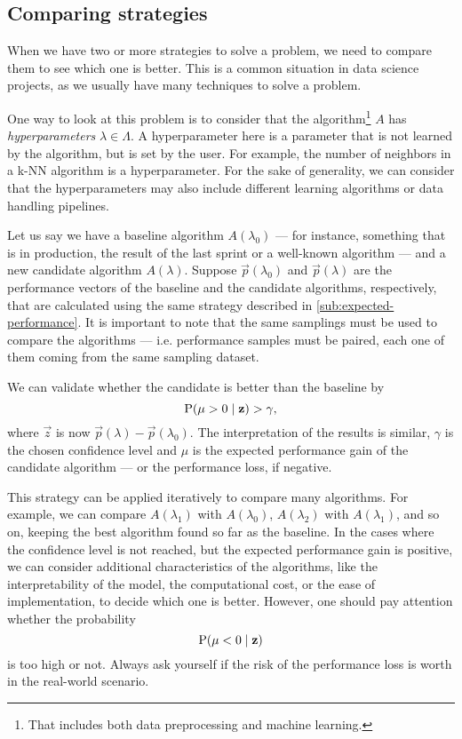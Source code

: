 \subsection{Comparing strategies}
\label{sub:comparison}

When we have two or more strategies to solve a problem, we need to compare them to see
which one is better.  This is a common situation in data science projects, as we usually
have many techniques to solve a problem.

One way to look at this problem is to consider that the algorithm\footnote{That includes
both data preprocessing and machine learning.} $A$ has \emph{hyperparameters} $\lambda \in
\Lambda$.  A hyperparameter here is a parameter that is not learned by the algorithm, but
is set by the user.  For example, the number of neighbors in a k-NN algorithm is a
hyperparameter.  For the sake of generality, we can consider that the hyperparameters may
also include different learning algorithms or data handling pipelines.

Let us say we have a baseline algorithm $A(\lambda_0)$ --- for instance, something that is
in production, the result of the last sprint or a well-known algorithm --- and a new candidate algorithm $A(\lambda)$.
Suppose $\vec{p}(\lambda_0)$ and $\vec{p}(\lambda)$ are the performance vectors of the
baseline and the candidate algorithms, respectively, that are calculated using the same
strategy described in \cref{sub:expected-performance}.  It is important to note that the
same samplings must be used to compare the algorithms --- i.e. performance samples must be
paired, each one of them coming from the same sampling dataset.

We can validate whether the
candidate is better than the baseline by
\begin{equation*}
  \operatorname{P}(\mu > 0 \mid \mathbf{z}) > \gamma\text{,}
\end{equation*}
where $\vec{z}$ is now $\vec{p}(\lambda) - \vec{p}(\lambda_0)$.  The interpretation of the
results is similar, $\gamma$ is the chosen confidence level and $\mu$ is the expected
performance gain of the candidate algorithm --- or the performance loss, if negative.

This strategy can be applied iteratively to compare many algorithms.  For example, we can
compare $A(\lambda_1)$ with $A(\lambda_0)$, $A(\lambda_2)$ with $A(\lambda_1)$, and so on,
keeping the best algorithm found so far as the baseline. In the cases where the confidence
level is not reached, but the expected performance gain is positive, we can consider
additional characteristics of the algorithms, like the interpretability of the model, the
computational cost, or the ease of implementation, to decide which one is better. However,
one should pay attention whether the probability
\begin{equation*}
  \operatorname{P}(\mu < 0 \mid \mathbf{z})
\end{equation*}
is too high or not.  Always ask yourself if the risk of the performance loss is worth in
the real-world scenario.


